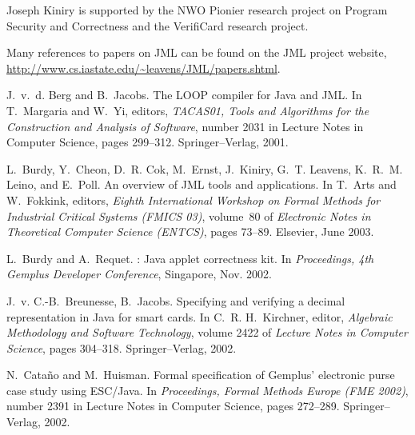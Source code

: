 \documentclass{sig-alternate}
\begin{document}
Joseph Kiniry is supported by the NWO Pionier research
project on Program Security and Correctness and the VerifiCard
research project. 


%

%  

\begin{thebibliography}{10}

Many references to papers on JML can be found on the JML project website,
  \url{http://www.cs.iastate.edu/~leavens/JML/papers.shtml}.

J.~v.~d. Berg and B.~Jacobs.
\newblock The {LOOP} compiler for {Java} and {JML}.
\newblock In T.~Margaria and W.~Yi, editors, {\em {TACAS01}, Tools and
  Algorithms for the Construction and Analysis of Software}, number 2031 in
  Lecture Notes in Computer Science, pages 299--312. Springer--Verlag, 2001.

L.~Burdy, Y.~Cheon, D.~R. Cok, M.~Ernst, J.~Kiniry, G.~T. Leavens, K.~R.~M.
  Leino, and E.~Poll.
\newblock An overview of {JML} tools and applications.
\newblock In T.~Arts and W.~Fokkink, editors, {\em Eighth International
  Workshop on Formal Methods for Industrial Critical Systems (FMICS 03)},
  volume~80 of {\em Electronic Notes in Theoretical Computer Science (ENTCS)},
  pages 73--89. Elsevier, June 2003.

L.~Burdy and A.~Requet.
: Java applet correctness kit.
\newblock In {\em Proceedings, 4th Gemplus Developer Conference}, Singapore,
  Nov. 2002.

J.~v. C.-B.~Breunesse, B.~Jacobs.
\newblock Specifying and verifying a decimal representation in {Java} for smart
  cards.
\newblock In C.~R. H.~Kirchner, editor, {\em Algebraic Methodology and Software
  Technology}, volume 2422 of {\em Lecture Notes in Computer Science}, pages
  304--318. Springer--Verlag, 2002.

N.~Cata{\~n}o and M.~Huisman.
\newblock Formal specification of {Gemplus'} electronic purse case study using
  {ESC/Java}.
\newblock In {\em Proceedings, Formal Methods Europe ({FME} 2002)}, number 2391
  in Lecture Notes in Computer Science, pages 272--289. Springer--Verlag, 2002.


\end{thebibliography}
\end{document}
